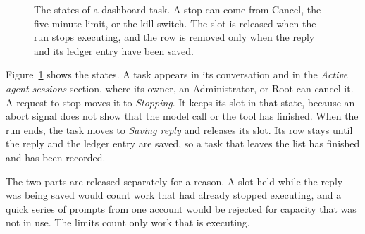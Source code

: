 \begin{figure}[htbp]
\centering
{}
\caption{The states of a dashboard task. A stop can come from Cancel, the
five-minute limit, or the kill switch. The slot is released when the run
stops executing, and the row is removed only when the reply and its ledger
entry have been saved.}
\label{fig:gov-taskslot}
\end{figure}

Figure~\ref{fig:gov-taskslot} shows the states. A task appears in its
conversation and in the \textit{Active agent sessions} section, where its
owner, an Administrator, or Root can cancel it. A request to stop moves it
to \textit{Stopping}. It keeps its slot in that state, because an abort
signal does not show that the model call or the tool has finished. When
the run ends, the task moves to \textit{Saving reply} and releases its
slot. Its row stays until the reply and the ledger entry are saved, so a
task that leaves the list has finished and has been recorded.

The two parts are released separately for a reason. A slot held while the
reply was being saved would count work that had already stopped executing,
and a quick series of prompts from one account would be rejected for
capacity that was not in use. The limits count only work that is
executing.


